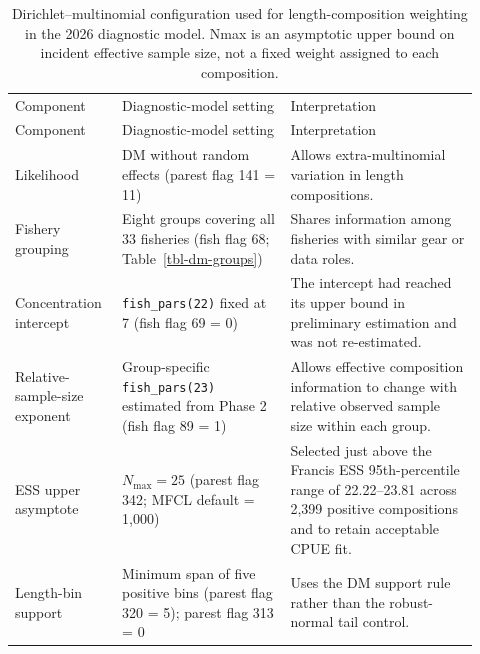 \documentclass[
  english,
  a4paper,
  a4paper,
  11pt]{SCreport}
\begin{document}
\begin{longtable}{@{}>{\raggedright\arraybackslash}p{0.20\linewidth}>{\raggedright\arraybackslash}p{0.34\linewidth}>{\raggedright\arraybackslash}p{0.38\linewidth}@{}}

\caption{\label{tbl-dm-configuration}Dirichlet--multinomial configuration used for length-composition weighting in the 2026 diagnostic model. Nmax is an asymptotic upper bound on incident effective sample size, not a fixed weight assigned to each composition.}

\tabularnewline

\\
\toprule
Component & Diagnostic-model setting & Interpretation \\
\midrule
\endfirsthead
\toprule
Component & Diagnostic-model setting & Interpretation \\
\midrule
\endhead
\bottomrule
\endlastfoot
Likelihood & DM without random effects (parest flag 141 = 11) & Allows extra-multinomial variation in length compositions. \\
Fishery grouping & Eight groups covering all 33 fisheries (fish flag 68; Table~\ref{tbl-dm-groups}) & Shares information among fisheries with similar gear or data roles. \\
Concentration intercept & \texttt{fish\_pars(22)} fixed at 7 (fish flag 69 = 0) & The intercept had reached its upper bound in preliminary estimation and was not re-estimated. \\
Relative-sample-size exponent & Group-specific \texttt{fish\_pars(23)} estimated from Phase 2 (fish flag 89 = 1) & Allows effective composition information to change with relative observed sample size within each group. \\
ESS upper asymptote & $N_{\max}=25$ (parest flag 342; MFCL default = 1,000) & Selected just above the Francis ESS 95th-percentile range of 22.22--23.81 across 2,399 positive compositions and to retain acceptable CPUE fit. \\
Length-bin support & Minimum span of five positive bins (parest flag 320 = 5); parest flag 313 = 0 & Uses the DM support rule rather than the robust-normal tail control. \\

\end{longtable}

\endgroup

\vspace{0.8em}
\end{document}
